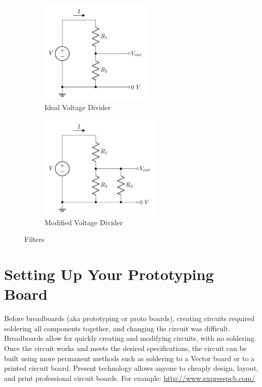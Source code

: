 \documentclass[10pt]{PhysLab1C} %
\begin{document}
\begin{figure}[h]
     \centering
     \begin{subfigure}[b]{0.4\textwidth}
         \centering
         \includegraphics[height=5cm]{lab2fig/ideal-vd.png}
         \caption{Ideal Voltage Divider}
         \label{ideal-vd}
     \end{subfigure}
     \begin{subfigure}[b]{0.4\textwidth}
         \centering
         \includegraphics[height=5cm]{lab2fig/modified-vd.png}
         \caption{Modified Voltage Divider}
         \label{modified-vd}
     \end{subfigure}
     \medskip
        \caption{Filters}
        \label{fig:bnc}
\end{figure}




\section{Setting Up Your Prototyping Board}

Before breadboards (aka prototyping or proto boards), creating circuits
required soldering all components together, and changing the circuit was
difficult. Breadboards allow for quickly creating and modifying
circuits, with no soldering. Once the circuit works and meets the
desired specifications, the circuit can be built using more permanent
methods such as soldering to a Vector board or to a printed circuit
board. Present technology allows anyone to cheaply design, layout, and
print professional circuit boards. For example:
\url{http://www.expresspcb.com/}
\end{document}
